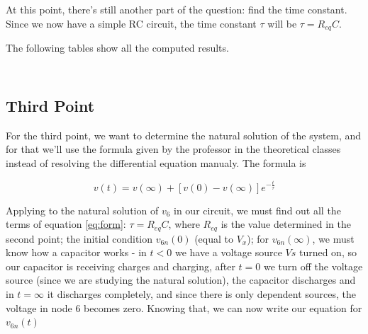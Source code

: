 \par At this point, there's still another part of the question: find the time constant. Since we now have a simple RC circuit, the time constant $\tau$ will be $\tau = R_{eq}C$.
\par The following tables show all the computed results.

\vspace{5mm}
\begin{table}[h!]
\centering
\begin{tabularx}{0.6\textwidth} {
  | >{\raggedright\arraybackslash}X
  | >{\raggedleft\arraybackslash}X | }
 \hline

\end{tabularx}
\end{table}

\vspace{5mm}
\begin{table}[h!]
\centering
\begin{tabularx}{0.6\textwidth} {
  | >{\raggedright\arraybackslash}X
  | >{\raggedleft\arraybackslash}X | }
 \hline

\end{tabularx}
\end{table}
\vspace{5mm}


\subsection{Third Point}
\label{ssec:3T}

\noindent \par For the third point, we want to determine the natural solution of the system, and for that we'll use the formula given by the professor in the theoretical classes instead of resolving the differential equation manualy. The formula is 

\begin{equation}
  v(t) = v(\infty) + [v(0) - v(\infty)]e^{-\frac{t}{\tau}}
  \label{eq:form}
\end{equation}

\par Applying to the natural solution of $v_6$ in our circuit, we must find out all the terms of equation \ref{eq:form}: $\tau=R_{eq}C$, where $R_{eq}$ is the value determined in the second point; the initial condition $v_{6n}(0)$ (equal to $V_x$); for $v_{6n}(\infty)$, we must know how a capacitor works - in $t<0$ we have a voltage source $Vs$ turned on, so our capacitor is receiving charges and charging, after $t=0$ we turn off the voltage source (since we are studying the natural solution), the capacitor discharges and in $t=\infty$ it discharges completely, and since there is only dependent sources, the voltage in node 6 becomes zero. Knowing that, we can now write our equation for $v_{6n}(t)$

